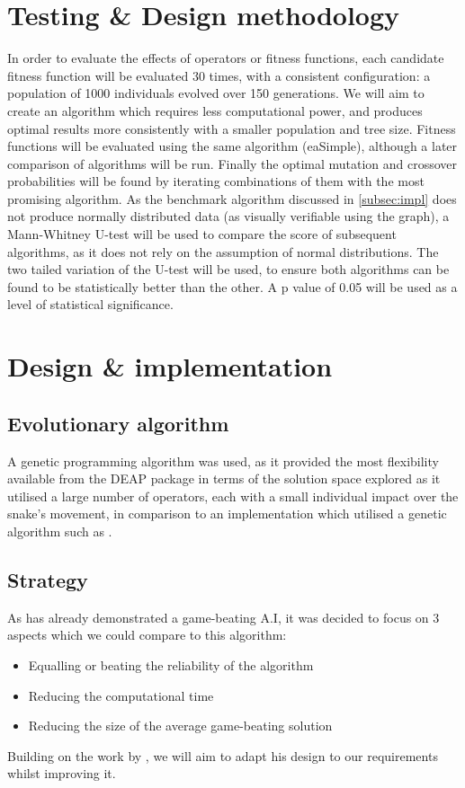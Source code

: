 \documentclass[british,10pt,a4paper]{article}
\begin{document}
\section{Testing \& Design methodology}
\label{sec:methodology}
In order to evaluate the effects of operators or fitness functions, each candidate fitness function will be evaluated 30 times, with a consistent configuration: a population of 1000 individuals evolved over 150 generations. We will aim to create an algorithm which requires less computational power, and produces optimal results more consistently with a smaller population and tree size. Fitness functions will be evaluated using the same algorithm (eaSimple), although a later comparison of algorithms will be run. Finally the optimal mutation and crossover probabilities will be found by iterating combinations of them with the most promising algorithm. As the benchmark algorithm discussed in \autoref{subsec:impl} does not produce normally distributed data (as visually verifiable using the graph), a Mann-Whitney U-test will be used to compare the score of subsequent algorithms, as it does not rely on the assumption of normal distributions. The two tailed variation of the U-test will be used, to ensure both algorithms can be found to be statistically better than the other. A p value of 0.05 will be used as a level of statistical significance.\newline


\section{Design \& implementation}
\subsection{Evolutionary algorithm}
A genetic programming algorithm was used, as it provided the most flexibility available from the DEAP package in terms of the solution space explored as it utilised a large number of operators, each with a small individual impact over the snake's movement, in comparison to an implementation which utilised a genetic algorithm such as \citet{Yeh2016-ts}.

\subsection{Strategy}
As \citet{Ehlis2000-sz} has already demonstrated a game-beating A.I, it was decided to focus on 3 aspects which we could compare to this algorithm:
\begin{itemize}
	\item Equalling or beating the reliability of the algorithm
	\item Reducing the computational time
	\item Reducing the size of the average game-beating solution
\end{itemize}
Building on the work by \citeauthor{Ehlis2000-sz}, we will aim to adapt his design to our requirements whilst improving it. \newline
\end{document}
